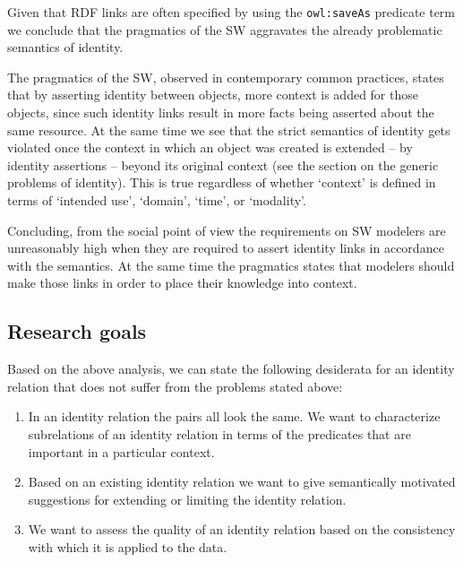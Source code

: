 \noindent Given that RDF links are often specified by using
  the {\small \texttt{owl:saveAs}} predicate term \cite{Void2011}
  we conclude that the pragmatics of the SW
  aggravates the already problematic semantics of identity.

The pragmatics of the SW, observed in contemporary common practices,
  states that by asserting identity between objects,
  more context is added for those objects,
  since such identity links result in more facts being asserted
  about the same resource.
At the same time we see that the strict semantics of identity
  gets violated once the context in which an object was created
  is extended -- by identity assertions -- beyond its original context
  (see the section on the generic problems of identity).
This is true regardless of whether `context' is defined in terms of
  `intended use', `domain', `time', or `modality'.

Concluding, from the social point of view the requirements on SW modelers
  are unreasonably high when they are required to
  assert identity links in accordance with the semantics.
At the same time the pragmatics states that modelers should
  make those links in order to place their knowledge into context.



\subsection{Research goals}
\label{sec:research_goals}

Based on the above analysis, we can state the following desiderata for 
an identity relation that does not suffer from the problems stated above: 

\begin{enumerate}
\item In an identity relation the pairs all look the same.
      We want to characterize subrelations of an identity relation in terms
      of the predicates that are important in a particular context.
\item Based on an existing identity relation we want to give semantically
      motivated suggestions for extending or limiting the identity relation.
\item We want to assess the quality of an identity relation based on
      the consistency with which it is applied to the data.
\end{enumerate}
